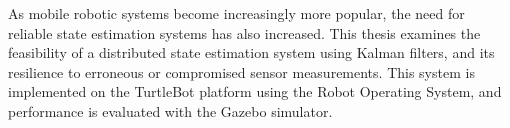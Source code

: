 \documentclass[thesis.tex]{subfile}
\begin{document}
As mobile robotic systems become increasingly more popular, the need for reliable state estimation systems has also increased. This thesis examines the feasibility of a distributed state estimation system using Kalman filters, and its resilience to erroneous or compromised sensor measurements. This system is implemented on the TurtleBot platform using the Robot Operating System, and performance is evaluated with the Gazebo simulator.
\end{document}
